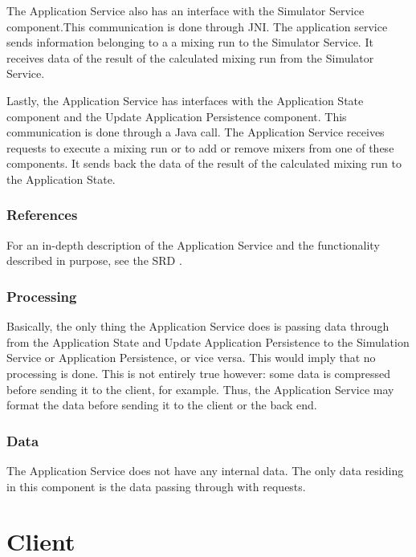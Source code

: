 The Application Service also has an interface with the Simulator Service component.This communication is done through JNI. The application service sends information belonging to a a mixing run to the Simulator Service. It receives data of the result of the calculated mixing run from the Simulator Service.

Lastly, the Application Service has interfaces with the Application State component and the Update Application Persistence component. This communication is done through a Java call. The Application Service receives requests to execute a mixing run or to add or remove mixers from one of these components. It sends back the data of the result of the calculated mixing run to the Application State.

\subsubsection*{References}
For an in-depth description of the Application Service and the functionality described in purpose, see the SRD \cite{srd}.

\subsubsection*{Processing}
Basically, the only thing the Application Service does is passing data through from the Application State and Update Application Persistence to the Simulation Service or Application Persistence, or vice versa. This would imply that no processing is done. This is not entirely true however: some data is compressed before sending it to the client, for example. Thus, the Application Service may format the data before sending it to the client or the back end.

\subsubsection*{Data}
The Application Service does not have any internal data. The only data residing in this component is the data passing through with requests.

\section{Client}
